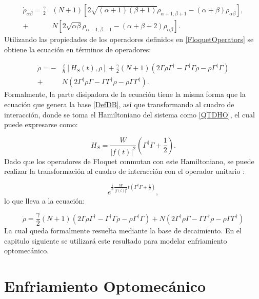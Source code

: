\documentclass[a4paper,10pt]{report}
\begin{document}
\begin{align*}
\dot{\rho}_{\alpha \beta} = \frac{\gamma}{2}&(N+1)[2\sqrt{(\alpha+1)(\beta + 1)}\rho_{\alpha+1,\beta+1} - (\alpha + \beta)\rho_{\alpha \beta}],\\
+& N[2\sqrt{\alpha \beta}\rho_{\alpha-1,\beta-1} - (\alpha + \beta + 2)\rho_{\alpha \beta}].
\end{align*}Utilizando las propiedades de los operadores definidos en \ref{FloquetOperators} se obtiene la ecuación en términos de operadores:

\begin{align*}
\dot{\rho} = -&\frac{i}{\hbar}[H_S (t),\rho] + \frac{\gamma}{2}(N+1)(2\Gamma\rho\Gamma^\dagger - \Gamma^\dagger\Gamma \rho - \rho \Gamma^\dagger \Gamma )\\
 +& N(2\Gamma^\dagger \rho \Gamma - \Gamma \Gamma^\dagger \rho - \rho \Gamma\Gamma^\dagger).
\end{align*} Formalmente, la parte disipadora de la ecuación tiene la misma forma que la ecuación que genera la base \ref{DefDB}, así que transformando al cuadro de interacción, donde se toma el Hamiltoniano del sistema como \ref{QTDHO}, el cual puede expresarse como\cite{BrownPT}:

\begin{equation}
H_S = \frac{W}{|f(t)|^2}(\Gamma^\dagger \Gamma + \frac{1}{2}).
\end{equation} Dado que los operadores de Floquet conmutan con este Hamiltoniano, se puede realizar la transformación al cuadro de interacción con el operador unitario \cite{SakuraiQM}:

\begin{equation}
 e^{\frac{i}{\hbar}\frac{W}{|f(t)|^2}t(\Gamma^\dagger \Gamma + \frac{1}{2})},
\end{equation}lo que lleva a la ecuación:

\begin{equation} \label{GammaLindblat}
\dot{\rho}=\frac{\gamma}{2}(N+1)(2\Gamma\rho\Gamma^\dagger - \Gamma^\dagger\Gamma \rho - \rho \Gamma^\dagger \Gamma )
 + N(2\Gamma^\dagger \rho \Gamma - \Gamma \Gamma^\dagger \rho - \rho \Gamma\Gamma^\dagger)
\end{equation}La cual queda formalmente resuelta mediante la base de decaimiento. En el capitulo siguiente se utilizará este resultado para modelar enfriamiento optomecánico.


\chapter{Enfriamiento Optomecánico}
\end{document}
